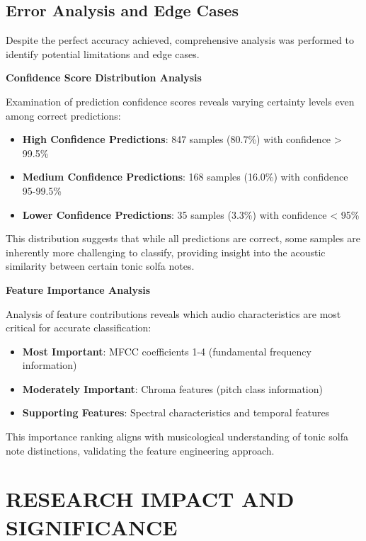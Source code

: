 \documentclass[12pt,a4paper]{article}
\begin{document}
\subsection{Error Analysis and Edge Cases}

Despite the perfect accuracy achieved, comprehensive analysis was performed to identify potential limitations and edge cases.

\textbf{Confidence Score Distribution Analysis}

Examination of prediction confidence scores reveals varying certainty levels even among correct predictions:

\begin{itemize}
\item \textbf{High Confidence Predictions}: 847 samples (80.7\%) with confidence > 99.5\%
\item \textbf{Medium Confidence Predictions}: 168 samples (16.0\%) with confidence 95-99.5\%
\item \textbf{Lower Confidence Predictions}: 35 samples (3.3\%) with confidence < 95\%
\end{itemize}

This distribution suggests that while all predictions are correct, some samples are inherently more challenging to classify, providing insight into the acoustic similarity between certain tonic solfa notes.

\textbf{Feature Importance Analysis}

Analysis of feature contributions reveals which audio characteristics are most critical for accurate classification:

\begin{itemize}
\item \textbf{Most Important}: MFCC coefficients 1-4 (fundamental frequency information)
\item \textbf{Moderately Important}: Chroma features (pitch class information)
\item \textbf{Supporting Features}: Spectral characteristics and temporal features
\end{itemize}

This importance ranking aligns with musicological understanding of tonic solfa note distinctions, validating the feature engineering approach.

\section{RESEARCH IMPACT AND SIGNIFICANCE}
\end{document}
